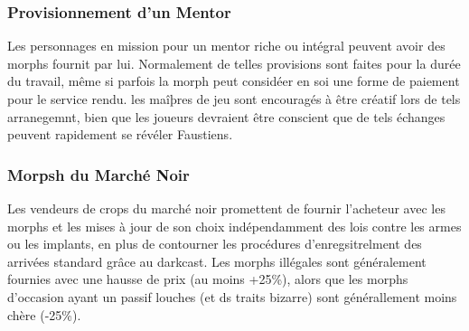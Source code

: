 \subsubsection{Provisionnement d'un Mentor} 

Les personnages en mission pour un mentor riche ou intégral peuvent avoir des morphs fournit par lui. Normalement de telles provisions sont faites pour la durée du travail, même si parfois la morph peut considéer en soi une forme de paiement pour le service rendu. les maîþres de jeu sont encouragés à être créatif lors de tels arranegemnt, bien que les joueurs devraient être conscient que de tels échanges peuvent rapidement se révéler Faustiens. 

\subsubsection{Morpsh du Marché Noir} 

Les vendeurs de crops du marché noir promettent de fournir l'acheteur avec les morphs et les mises à jour de son choix indépendamment des lois contre les armes ou les implants, en plus de contourner les procédures d'enregsitrelment des arrivées standard grâce au darkcast. Les morphs illégales sont généralement fournies avec une hausse de prix (au moins +25\%), alors que les morphs d'occasion ayant un passif louches (et ds traits bizarre) sont générallement moins chère (-25\%). 

